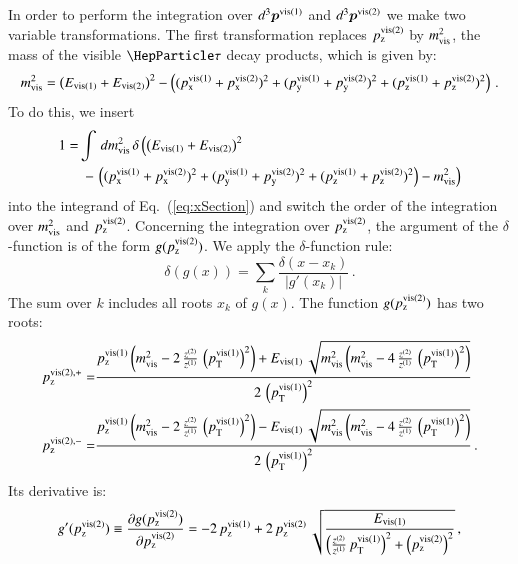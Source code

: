 In order to perform the integration over $d^{3}\bm{p}^{\textrm{vis}(1)}$ and $d^{3}\bm{p}^{\textrm{vis}(2)}$ we make two variable transformations.
The first transformation replaces $p_{\textrm{z}}^{\textrm{vis}(2)}$ by $m_{\textrm{vis}}^{2}$,
the mass of the visible $\Pgt$ decay products, which is given by:
\begin{equation}
m_{\textrm{vis}}^{2} = 
  \left( E_{\textrm{vis}(1)} + E_{\textrm{vis}(2)} \right)^{2} 
- \left( (p_{\textrm{x}}^{\textrm{vis}(1)} + p_{\textrm{x}}^{\textrm{vis}(2)})^{2} + (p_{\textrm{y}}^{\textrm{vis}(1)} + p_{\textrm{y}}^{\textrm{vis}(2)})^{2} + (p_{\textrm{z}}^{\textrm{vis}(1)} + p_{\textrm{z}}^{\textrm{vis}(2)})^{2} \right) \, .
\label{eq:m_vis}
\end{equation}
To do this, we insert
\begin{align}
1 = & \int \, dm_{\textrm{vis}}^{2} \, \delta\left(
  \left( E_{\textrm{vis}(1)} + E_{\textrm{vis}(2)} \right)^{2} \right. \nonumber \\ 
& \
 - \left. \left( (p_{\textrm{x}}^{\textrm{vis}(1)} + p_{\textrm{x}}^{\textrm{vis}(2)})^{2} + (p_{\textrm{y}}^{\textrm{vis}(1)} + p_{\textrm{y}}^{\textrm{vis}(2)})^{2} + (p_{\textrm{z}}^{\textrm{vis}(1)} + p_{\textrm{z}}^{\textrm{vis}(2)})^{2} \right) - m_{\textrm{vis}}^{2} \right) \nonumber
\end{align} 
into the integrand of Eq.~(\ref{eq:xSection}) and switch the order of the integration 
over $m_{\textrm{vis}}^{2}$ and $p_{\textrm{z}}^{\textrm{vis}(2)}$. 
Concerning the integration over $p_{\textrm{z}}^{\textrm{vis}(2)}$, the argument of the $\delta$-function is of the form $g(p_{\textrm{z}}^{\textrm{vis}(2)})$.
We apply the $\delta$-function rule:
\begin{equation} 
\delta \left( g(x) \right) = \sum_{k} \frac{\delta \left( x - x_{k}
  \right)}{\vert g'(x_{k}) \vert} \, .
\label{eq:deltaFuncRule}
\end{equation}
The sum over $k$ includes all roots $x_{k}$ of $g(x)$.
The function $g(p_{\textrm{z}}^{\textrm{vis}(2)})$ has two roots:
\begin{align} 
p_{\textrm{z}}^{\textrm{vis}(2),+} = & \frac{p_{\textrm{z}}^{\textrm{vis}(1)} \left(m_{\textrm{vis}}^{2} - 2 \,
  \frac{z^{(2)}}{z^{(1)}} \, \left(p_{\textrm{T}}^{\textrm{vis}(1)}\right)^{2}\right) + E_{\textrm{vis}(1)} \,
  \sqrt{m_{\textrm{vis}}^{2} \left(m_{\textrm{vis}}^{2} - 4 \, \frac{z^{(2)}}{z^{(1)}} \, \left(p_{\textrm{T}}^{\textrm{vis}(1)}\right)^{2}\right)}}{2 \, \left(p_{\textrm{T}}^{\textrm{vis}(1)}\right)^{2}} \nonumber \\
p_{\textrm{z}}^{\textrm{vis}(2),-} = & \frac{p_{\textrm{z}}^{\textrm{vis}(1)} \left(m_{\textrm{vis}}^{2} - 2 \,
  \frac{z^{(2)}}{z^{(1)}} \, \left(p_{\textrm{T}}^{\textrm{vis}(1)}\right)^{2}\right) - E_{\textrm{vis}(1)} \,
  \sqrt{m_{\textrm{vis}}^{2} \left(m_{\textrm{vis}}^{2} - 4 \, \frac{z^{(2)}}{z^{(1)}} \, \left(p_{\textrm{T}}^{\textrm{vis}(1)}\right)^{2}\right)}}{2 \, \left(p_{\textrm{T}}^{\textrm{vis}(1)}\right)^{2}} \, .
\label{eq:pzMapping}
\end{align}
Its derivative is:
\begin{equation} 
g'(p_{\textrm{z}}^{\textrm{vis}(2)}) \equiv 
  \frac{\partial g(p_{\textrm{z}}^{\textrm{vis}(2)})}{\partial p_{\textrm{z}}^{\textrm{vis}(2)}} = 
 - 2 \, p_{\textrm{z}}^{\textrm{vis}(1)} 
 + 2 \, p_{\textrm{z}}^{\textrm{vis}(2)} \, \sqrt{\frac{E_{\textrm{vis}(1)}}{\left( \frac{z^{(2)}}{z^{(1)}} \, p_{\textrm{T}}^{\textrm{vis}(1)} \right)^{2} + \left(p_{\textrm{z}}^{\textrm{vis}(2)}\right)^{2}}} \, ,
\end{equation}
